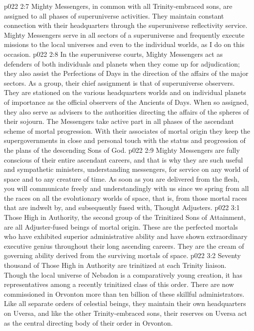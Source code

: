 \vs p022 2:7 \pc Mighty Messengers, in common with all Trinity\hyp{}embraced sons, are assigned to all phases of superuniverse activities. They maintain constant connection with their headquarters through the superuniverse reflectivity service. Mighty Messengers serve in all sectors of a superuniverse and frequently execute missions to the local universes and even to the individual worlds, as I do on this occasion.
\vs p022 2:8 In the superuniverse courts, Mighty Messengers act as defenders of both individuals and planets when they come up for adjudication; they also assist the Perfections of Days in the direction of the affairs of the major sectors. As a group, their chief assignment is that of superuniverse observers. They are stationed on the various headquarters worlds and on individual planets of importance as the official observers of the Ancients of Days. When so assigned, they also serve as advisers to the authorities directing the affairs of the spheres of their sojourn. The Messengers take active part in all phases of the ascendant scheme of mortal progression. With their associates of mortal origin they keep the supergovernments in close and personal touch with the status and progression of the plans of the descending Sons of God.
\vs p022 2:9 Mighty Messengers are fully conscious of their entire ascendant careers, and that is why they are such useful and sympathetic ministers, understanding messengers, for service on any world of space and to any creature of time. As soon as you are delivered from the flesh, you will communicate freely and understandingly with us since we spring from all the races on all the evolutionary worlds of space, that is, from those mortal races that are indwelt by, and subsequently fused with, Thought Adjusters.
\vs p022 3:1 Those High in Authority, the second group of the Trinitized Sons of Attainment, are all Adjuster\hyp{}fused beings of mortal origin. These are the perfected mortals who have exhibited superior administrative ability and have shown extraordinary executive genius throughout their long ascending careers. They are the cream of governing ability derived from the surviving mortals of space.
\vs p022 3:2 Seventy thousand of Those High in Authority are trinitized at each Trinity liaison. Though the local universe of Nebadon is a comparatively young creation, it has representatives among a recently trinitized class of this order. There are now commissioned in Orvonton more than ten billion of these skillful administrators. Like all separate orders of celestial beings, they maintain their own headquarters on Uversa, and like the other Trinity\hyp{}embraced sons, their reserves on Uversa act as the central directing body of their order in Orvonton.
